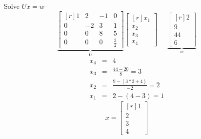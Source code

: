 \documentclass{jhwhw}
\begin{document}
Solve \(Ux = w\)
\[
   \underbrace{\begin{bmatrix*}[r]
	  1     &    2    &    -1   &  0 \\
	  0     &   -2    &     3   &  1 \\
	  0     &    0    &     8   &  5 \\
	  0     &    0    &     0   &  \frac{3}{2} 
	\end{bmatrix*}}_{U}
	\begin{bmatrix*}[r]
	   x_1  \\
	   x_2  \\
	   x_3  \\
	   x_4 
	\end{bmatrix*}
	 =
	\underbrace{\begin{bmatrix*}[r]
	    2  \\
	    9  \\
	   44  \\
	    6 
	 \end{bmatrix*}}_{w}
\]
\begin{eqnarray*}
  x_4 &=& 4 \nonumber \\
  x_3 &=& \frac{44-20}{8}  = 3\nonumber \\
  x_2 &=& \frac{9 - (3*3 + 4)}{-2}  = 2\nonumber \\
  x_1 &=& 2 - (4-3) = 1\nonumber 
\end{eqnarray*}
\[
x
	 =
	\begin{bmatrix*}[r]
	    1  \\
	    2  \\
	    3  \\
	    4 
	 \end{bmatrix*}
\]
\end{document}

